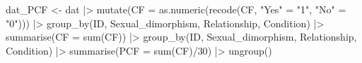 \documentclass[
  bookmarksnumbered]{article}
\newenvironment{Shaded}{\begin{snugshade}}{\end{snugshade}}
\newcommand{\AttributeTok}[1]{\textcolor[rgb]{0.80,0.80,0.80}{#1}}
\newcommand{\DecValTok}[1]{\textcolor[rgb]{0.86,0.86,0.80}{#1}}
\newcommand{\FunctionTok}[1]{\textcolor[rgb]{0.94,0.94,0.56}{#1}}
\newcommand{\NormalTok}[1]{\textcolor[rgb]{0.80,0.80,0.80}{#1}}
\newcommand{\OtherTok}[1]{\textcolor[rgb]{0.94,0.94,0.56}{#1}}
\newcommand{\SpecialCharTok}[1]{\textcolor[rgb]{0.86,0.64,0.64}{#1}}
\newcommand{\StringTok}[1]{\textcolor[rgb]{0.80,0.58,0.58}{#1}}
\begin{document}
\begin{Shaded}
\begin{Highlighting}[]
\NormalTok{dat\_PCF }\OtherTok{\textless{}{-}}\NormalTok{ dat }\SpecialCharTok{|\textgreater{}} 
  \FunctionTok{mutate}\NormalTok{(}\AttributeTok{CF =} \FunctionTok{as.numeric}\NormalTok{(}\FunctionTok{recode}\NormalTok{(CF,}
                                 \StringTok{"Yes"} \OtherTok{=}  \StringTok{"1"}\NormalTok{,}
                                 \StringTok{"No"} \OtherTok{=} \StringTok{"0"}\NormalTok{))) }\SpecialCharTok{|\textgreater{}} 
  \FunctionTok{group\_by}\NormalTok{(ID, Sexual\_dimorphism, Relationship, Condition) }\SpecialCharTok{|\textgreater{}} 
  \FunctionTok{summarise}\NormalTok{(}\AttributeTok{CF =} \FunctionTok{sum}\NormalTok{(CF)) }\SpecialCharTok{|\textgreater{}} 
  \FunctionTok{group\_by}\NormalTok{(ID, Sexual\_dimorphism, Relationship, Condition) }\SpecialCharTok{|\textgreater{}} 
  \FunctionTok{summarise}\NormalTok{(}\AttributeTok{PCF =} \FunctionTok{sum}\NormalTok{(CF)}\SpecialCharTok{/}\DecValTok{30}\NormalTok{) }\SpecialCharTok{|\textgreater{}} 
  \FunctionTok{ungroup}\NormalTok{()}


\end{Highlighting}
\end{Shaded}
\end{document}
